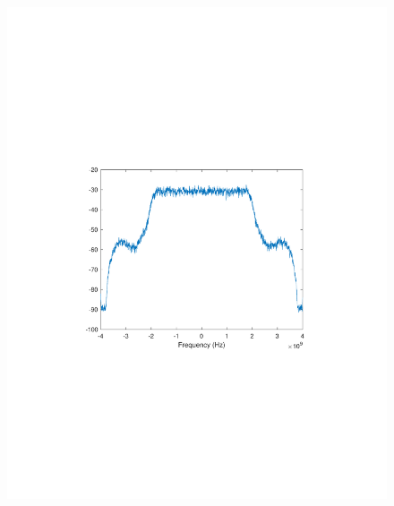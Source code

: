 \begin{refsection}
\begin{figure}[H]
	\centering
	\begin{minipage}{0.30\textwidth}
		\centering
		\includegraphics[clip, trim=4cm 8cm 4cm 8cm, width=1\textwidth]{./sdf/m_qam_system/figures/expResults/homodyne/3_4GBdInSig13dBc_AfMIMO1.pdf}
		\label{fig:4GBdEyeMIMO1}
	\end{minipage}
	\begin{minipage}{0.30\textwidth}
		\centering

\end{minipage}
\end{figure}
\end{refsection}
